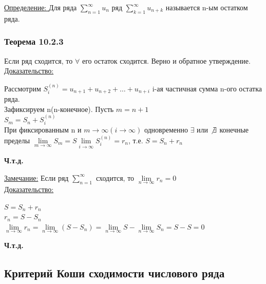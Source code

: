 \documentclass[12pt]{article}
\let\oldsum\sum
\let\oldlim\lim
\renewcommand{\sum}{\oldsum\limits}
\renewcommand{\lim}{\oldlim\limits}
\begin{document}
  \underline{Определение: } Для ряда $\sum_{n=1}^{\infty}u_n$ ряд $\sum_{k=1}^{\infty}u_{n+k}$ называется n-ым остатком ряда.\\
  \subsubsection*{Теорема 10.2.3}\label{th:10.2.3.}
  \par\noindent
  Если ряд сходится, то $\forall$ его остаток сходится. Верно и обратное утверждение.\\

  \underline{Доказательство:}
  \begin{adjustwidth}{1.5em}{1.5em}
    Рассмотрим $S_i^{(n)}=u_{n+1}+u_{n+2}+\dots+u_{n+i}$ i-ая частичная сумма n-ого остатка ряда.\\
    Зафиксируем n(n-конечное).
    Пусть $m=n+1$\\
    $S_m=S_n+S_i^{(n)}$\\
    При фиксированным n и $m \to \infty(i \to \infty)$ одновременно $\exists$ или $\not \exists$ конечные
    пределы $\lim_{m\to \infty}S_m=S\lim_{i\to \infty}S_i^{(n)}=r_n$, т.е. $S=S_n+r_n$
  \end{adjustwidth}
  \begin{center}
    \textbf{Ч.т.д.}
  \end{center}
  \underline{Замечание:} Если ряд $\sum_{n=1}^{\infty}$ сходится, то $\lim_{n \to \infty}r_n=0$\\
  \underline{Доказательство:}
  \begin{adjustwidth}{1.5em}{1.5em}
    \begin{center}
      $S=S_n+r_n$\\
      $r_n=S-S_n$\\
      $\lim_{n\to \infty}r_n=\lim_{n \to \infty}(S-S_n)=\lim_{n \to \infty}S-\lim_{n\to \infty}S_n=S-S=0$
    \end{center}
  \end{adjustwidth}
  \begin{center}
    \textbf{Ч.т.д.}
  \end{center}
  
  \subsection{Критерий Коши сходимости числового ряда}
\end{document}

